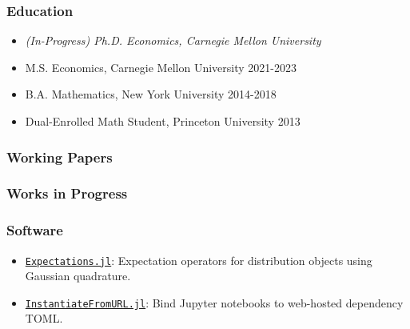 \documentclass[12pt]{article}   %
\begin{document}
\subsubsection*{Education}
\begin{itemize}
  \item \textit{(In-Progress) Ph.D. Economics, Carnegie Mellon University} 
  \item M.S. Economics, Carnegie Mellon University \hfill 2021-2023
  \item B.A. Mathematics, New York University \hfill 2014-2018
  \item Dual-Enrolled Math Student, Princeton University \hfill 2013
\end{itemize} 




\subsubsection*{Working Papers}
\begin{refsection} %
\nocite{NBERw28981}
\hspace*{1.2cm}%
\begin{minipage}{0.9\textwidth}%
  \printbibliography[heading=none, sorting=ynt]
\end{minipage}%
\end{refsection}

\subsubsection*{Works in Progress}
\begin{refsection} %
\nocite{FP}
\hspace*{1.2cm}%
\begin{minipage}{0.9\textwidth}%
  \printbibliography[heading=none, sorting=ynt]
\end{minipage}%
\end{refsection}


\subsubsection*{Software}
\begin{itemize}
  \item \href{https://github.com/QuantEcon/Expectations.jl}{\texttt{Expectations.jl}}: Expectation operators for distribution objects using Gaussian quadrature.
  \item \href{https://github.com/QuantEcon/InstantiateFromURL.jl}{\texttt{InstantiateFromURL.jl}}: Bind Jupyter notebooks to web-hosted dependency TOML.
\end{itemize}
\end{document}
